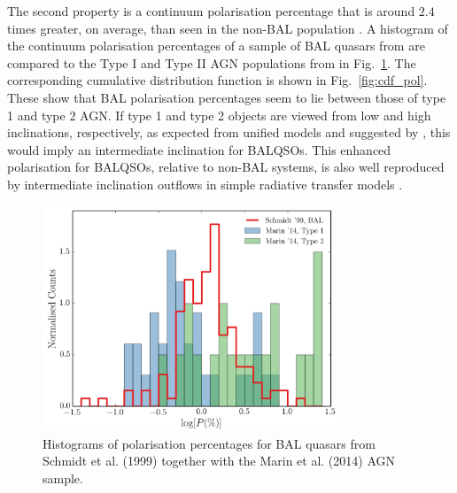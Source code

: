 The second property 
is a continuum polarisation percentage that is around $2.4$ times greater, 
on average, than seen in the non-BAL population \citep{schmidt1999}.
A histogram of the continuum polarisation percentages of a sample of BAL quasars from 
\cite{schmidt1999} are compared to the Type I and Type II AGN 
populations from \cite{marin2014} in Fig.~\ref{fig:bal_polarisation}.
The corresponding cumulative distribution function is shown in Fig.~\ref{fig:cdf_pol}.
These show that BAL polarisation percentages seem to lie between those of type 1
and type 2 AGN. If type 1 and type 2 objects are viewed from low and high 
inclinations, respectively, as expected from unified models and suggested by
\cite{marin2014,marin2016}, this would imply  an intermediate inclination
for BALQSOs. This enhanced polarisation for BALQSOs, relative to non-BAL systems,
is also well reproduced by intermediate
inclination outflows in simple radiative transfer models \citep{marin2013}.

\begin{figure}
\centering
\includegraphics[width=0.8\textwidth]{figures/ewpaper/hist_p.png}
\caption
{
Histograms of polarisation percentages 
for BAL quasars from Schmidt et al. (1999) together with the 
Marin et al. (2014) AGN sample. 
}
\label{fig:bal_polarisation}
\end{figure}

